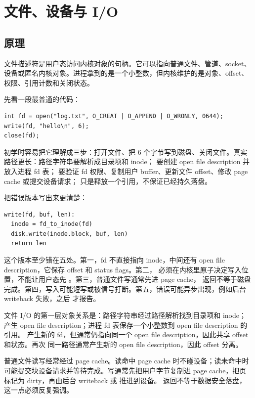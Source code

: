 \chapter{文件、设备与 I/O}

\section{原理}

文件描述符是用户态访问内核对象的句柄。它可以指向普通文件、管道、socket、设备或匿名内核对象。进程拿到的是一个小整数，但内核维护的是对象、offset、权限、引用计数和关闭状态。

先看一段最普通的代码：

\begin{lstlisting}
int fd = open("log.txt", O_CREAT | O_APPEND | O_WRONLY, 0644);
write(fd, "hello\n", 6);
close(fd);
\end{lstlisting}

初学时容易把它理解成三步：打开文件、把 6 个字节写到磁盘、关闭文件。真实路径更长：路径字符串要解析成目录项和 inode； 要创建 open file description 并放入进程 fd 表； 要验证 fd 权限、复制用户 buffer、更新文件 offset、修改 page cache 或提交设备请求； 只是释放一个引用，不保证已经持久落盘。

把错误版本写出来更清楚：

\begin{lstlisting}
write(fd, buf, len):
  inode = fd_to_inode(fd)
  disk.write(inode.block, buf, len)
  return len
\end{lstlisting}

这个版本至少错在五处。第一，fd 不直接指向 inode，中间还有 open file description，它保存 offset 和 status flags。第二， 必须在内核里原子决定写入位置，不能让用户态先 。第三，普通文件写通常先进 page cache， 返回不等于磁盘完成。第四，写入可能短写或被信号打断。第五，错误可能异步出现，例如后台 writeback 失败，之后  才报告。

文件 I/O 的第一层对象关系是：路径字符串经过路径解析找到目录项和 inode； 产生 open file description；进程 fd 表保存一个小整数到 open file description 的引用。 产生新的 fd，但通常仍指向同一个 open file description，因此共享 offset 和状态。再次  同一路径通常产生新的 open file description，因此 offset 分离。

普通文件读写经常经过 page cache。读命中 page cache 时不碰设备；读未命中时可能提交块设备请求并等待完成。写通常先把用户字节复制进 page cache，把页标记为 dirty，再由后台 writeback 或  推进到设备。 返回不等于数据安全落盘，这一点必须反复强调。

